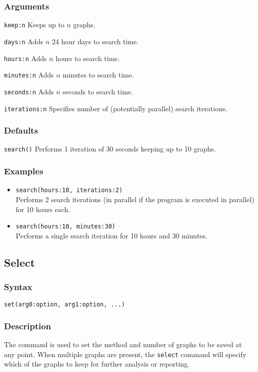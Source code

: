\documentclass[11pt]{article}
\begin{document}
		\subsubsection{Arguments}
		\noindent \texttt{keep:n} Keeps up to $n$ graphs.
		
		\smallskip		
		\noindent \texttt{days:n} Adds $n$ 24 hour days to search time.
		
		\smallskip		
		\noindent \texttt{hours:n} Adds $n$ hours to search time.
		
		\smallskip		
		\noindent \texttt{minutes:n} Adds $n$ minutes to search time.
		
		\smallskip		
		\noindent \texttt{seconds:n} Adds $n$ seconds to search time.
		
		\smallskip		
		\noindent \texttt{iterations:n} Specifies number of (potentially parallel) search iterations.
		
		\subsubsection{Defaults}
		\texttt{search()} Performs 1 iteration of 30 seconds keeping up to 10 graphs.
		\subsubsection{Examples}
		\begin{itemize}
			\item{\texttt{search(hours:10, iterations:2)}\\ Performs 2 search iterations (in parallel if the program is executed in parallel) for 10 hours each.}
			\item{\texttt{search(hours:10, minutes:30)}\\ Performs a single search iteration for 10 hours and 30 minutes.}
		\end{itemize}
	
	
	\subsection{Select}
		\subsubsection{Syntax}
			\texttt{set(arg0:option, arg1:option, ...)}
		\subsubsection{Description}
			The command is used to set the method and number of graphs to be saved at any point.
			When multiple graphs are present, the \texttt{select} command will specify which of the graphs to
			keep for further analysis or reporting.
\end{document}
